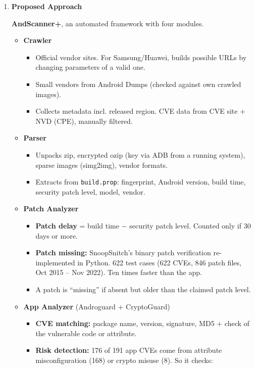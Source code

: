 \documentclass[11pt,a4paper]{article}
\newcommand{\entrypart}[1]{\textbf{\color{accent}#1}\par\vspace{2pt}}
\begin{document}
\begin{enumerate}
    \item \entrypart{Proposed Approach}

    \textbf{AndScanner+}, an automated framework with four modules.

    \begin{itemize}
        \item \textbf{Crawler}
        \begin{itemize}
            \item Official vendor sites. For Samsung/Huawei, builds possible URLs by changing parameters of a valid one.
            \item Small vendors from Android Dumps (checked against own crawled images).
            \item Collects metadata incl. released region. CVE data from CVE site + NVD (CPE), manually filtered.
        \end{itemize}
        \item \textbf{Parser}
        \begin{itemize}
            \item Unpacks zip, encrypted ozip (key via ADB from a running system), sparse images (simg2img), vendor formats.
            \item Extracts from \texttt{build.prop}: fingerprint, Android version, build time, security patch level, model, vendor.
        \end{itemize}
        \item \textbf{Patch Analyzer}
        \begin{itemize}
            \item \textbf{Patch delay} = build time $-$ security patch level. Counted only if 30 days or more.
            \item \textbf{Patch missing:} SnoopSnitch's binary patch verification re-implemented in Python. 622 test cases (622 CVEs, 846 patch files, Oct 2015 -- Nov 2022). Ten times faster than the app.
            \item A patch is ``missing'' if absent but older than the claimed patch level.
        \end{itemize}
        \item \textbf{App Analyzer} (Androguard + CryptoGuard)
        \begin{itemize}
            \item \textbf{CVE matching:} package name, version, signature, MD5 + check of the vulnerable code or attribute.
            \item \textbf{Risk detection:} 176 of 191 app CVEs come from attribute misconfiguration (168) or crypto misuse (8). So it checks:

\end{itemize}
\end{itemize}
\end{enumerate}
\end{document}
